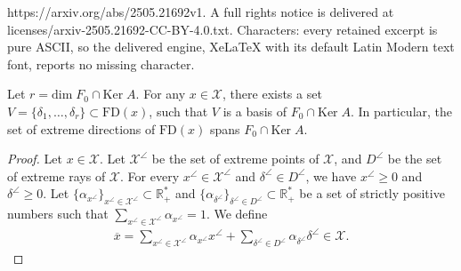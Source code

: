 \documentclass[10pt,a4paper]{amsart}
\newcommand{\FD}{\mathrm{FD}}
\newcommand{\Ker}[0]{\mathrm{Ker}\;}
\newcommand{\R}[0]{\mathbb R}
\newcommand{\cX}{\mathcal{X}}
\renewcommand{\dim}[0]{\mathrm{dim}\;}
\begin{document}
https://arxiv.org/abs/2505.21692v1. A full rights notice is delivered at licenses/arxiv-2505.21692-CC-BY-4.0.txt. Characters: every retained excerpt is pure ASCII, so the delivered engine, XeLaTeX with its default Latin Modern text font, reports no missing character.
\begin{lemma} \label{lemma:feasible directions in general polyhedron}
            Let $r=\dim F_0 \cap \Ker A$. For any $x\in \cX$, there exists a set $V=\{\delta_1,\dots,\delta_r\}\subset \FD(x)$, such that $V$ is a basis of $F_0 \cap \Ker A$. In particular, the set of extreme directions of $\FD(x)$ spans $F_0\cap \Ker A$.
        \end{lemma}

\begin{proof}
            Let $x\in \cX$. Let $\cX^\angle$ be the set of extreme points of $\cX$, and $D^\angle$ be the set of extreme rays of $\cX$. For every $x^\angle \in \cX^\angle$ and $\delta^\angle \in D^\angle$, we have $x^\angle \geq 0$ and $\delta^\angle \geq 0$. Let $\{\alpha_{x^\angle}\}_{x^\angle \in \cX^\angle}\subset \R^*_+$ and $\{\alpha_{\delta^\angle}\}_{\delta^\angle \in D^\angle}\subset \R^*_+$ be a set of strictly positive numbers such that $\sum_{x^\angle \in \cX^\angle}^{}\alpha_{x^\angle}=1$. We define 
            \begin{align*}
                \overline{x}=\sum_{x^\angle \in \cX^\angle}^{}\alpha_{x^\angle}x^\angle + \sum_{\delta^\angle \in D^\angle}^{}\alpha_{\delta^\angle}\delta^\angle\in \cX.
            \end{align*}


\end{proof}
\end{document}
